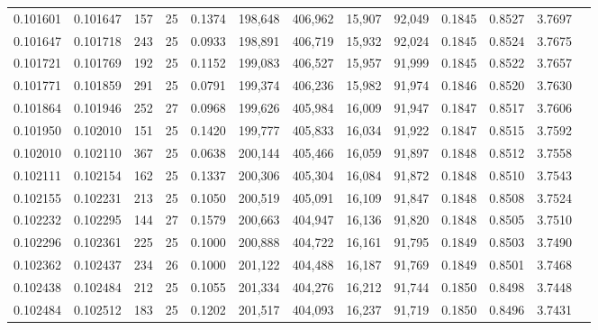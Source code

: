 \begin{tabular}{rrrrrrrrrrrrr}
0.101601 & 0.101647 & 157 &  25 &                                     0.1374 & 198,648 & 406,962 &  15,907 &  92,049 & 0.1845 & 0.8527 & 3.7697 \\
0.101647 & 0.101718 & 243 &  25 &                                     0.0933 & 198,891 & 406,719 &  15,932 &  92,024 & 0.1845 & 0.8524 & 3.7675 \\
0.101721 & 0.101769 & 192 &  25 &                                     0.1152 & 199,083 & 406,527 &  15,957 &  91,999 & 0.1845 & 0.8522 & 3.7657 \\
0.101771 & 0.101859 & 291 &  25 &                                     0.0791 & 199,374 & 406,236 &  15,982 &  91,974 & 0.1846 & 0.8520 & 3.7630 \\
0.101864 & 0.101946 & 252 &  27 &                                     0.0968 & 199,626 & 405,984 &  16,009 &  91,947 & 0.1847 & 0.8517 & 3.7606 \\
0.101950 & 0.102010 & 151 &  25 &                                     0.1420 & 199,777 & 405,833 &  16,034 &  91,922 & 0.1847 & 0.8515 & 3.7592 \\
0.102010 & 0.102110 & 367 &  25 &                                     0.0638 & 200,144 & 405,466 &  16,059 &  91,897 & 0.1848 & 0.8512 & 3.7558 \\
0.102111 & 0.102154 & 162 &  25 &                                     0.1337 & 200,306 & 405,304 &  16,084 &  91,872 & 0.1848 & 0.8510 & 3.7543 \\
0.102155 & 0.102231 & 213 &  25 &                                     0.1050 & 200,519 & 405,091 &  16,109 &  91,847 & 0.1848 & 0.8508 & 3.7524 \\
0.102232 & 0.102295 & 144 &  27 &                                     0.1579 & 200,663 & 404,947 &  16,136 &  91,820 & 0.1848 & 0.8505 & 3.7510 \\
0.102296 & 0.102361 & 225 &  25 &                                     0.1000 & 200,888 & 404,722 &  16,161 &  91,795 & 0.1849 & 0.8503 & 3.7490 \\
0.102362 & 0.102437 & 234 &  26 &                                     0.1000 & 201,122 & 404,488 &  16,187 &  91,769 & 0.1849 & 0.8501 & 3.7468 \\
0.102438 & 0.102484 & 212 &  25 &                                     0.1055 & 201,334 & 404,276 &  16,212 &  91,744 & 0.1850 & 0.8498 & 3.7448 \\
0.102484 & 0.102512 & 183 &  25 &                                     0.1202 & 201,517 & 404,093 &  16,237 &  91,719 & 0.1850 & 0.8496 & 3.7431 \\

\end{tabular}
